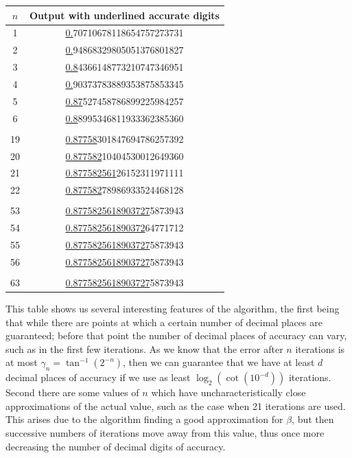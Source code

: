 {%
\begin{center}
\begin{tabular}{|c|c|}
	\hline
	\(n\) & Output with underlined accurate digits\\\hline
	1 & \underline{0.}70710678118654757273731\\\hline
	2 & \underline{0.}94868329805051376801827\\\hline
	3 & \underline{0.8}4366148773210747346951\\\hline
	4 & \underline{0.}90373783889353875853345\\\hline
	5 & \underline{0.87}527458786899225984257\\\hline
	6 & \underline{0.8}8995346811933362385360\\\hline
	\cdots & \cdots\\\hline
	19 & \underline{0.87758}301847694786257392\\\hline
	20 & \underline{0.877582}10404530012649360\\\hline
	21 & \underline{0.877582561}26152311971111\\\hline
	22 & \underline{0.877582}78986933524468128\\\hline
	\cdots & \cdots\\\hline
	53 & \underline{0.8775825618903727}5873943\\\hline
	54 & \underline{0.877582561890372}64771712\\\hline
	55 & \underline{0.8775825618903727}5873943\\\hline
	56 & \underline{0.8775825618903727}5873943\\\hline
	\cdots & \cdots\\\hline
	63 & \underline{0.8775825618903727}5873943\\\hline
\end{tabular}
\end{center}

This table shows us several interesting features of the algorithm, the first being that while there are points at which a certain number of decimal places are guaranteed; before that point the number of decimal places of accuracy can vary, such as in the first few iterations. As we know that the error after \(n\) iterations is at most \(\gamma_n = \tan^{-1}(2^{-n})\), then we can guarantee that we have at least \(d\) decimal places of accuracy if we use as least \(\log_2(\cot(10^{-d}))\) iterations.\\

Second there are some values of \(n\) which have uncharacteristically close approximations of the actual value, such as the case when 21 iterations are used. This arises due to the algorithm finding a good approximation for \(\beta\), but then successive numbers of iterations move away from this value, thus once more decreasing the number of decimal digits of accuracy.\\

}
